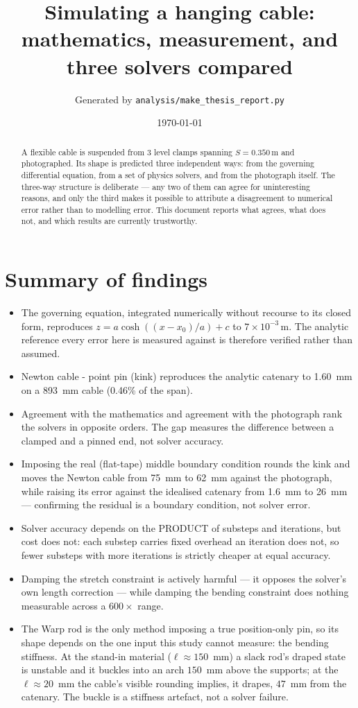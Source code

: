 \documentclass[11pt,a4paper]{article}
\title{Simulating a hanging cable:\\
       mathematics, measurement, and three solvers compared}
\author{Generated by \texttt{analysis/make\_thesis\_report.py}}
\date{\today}
\begin{document}
\maketitle

\begin{abstract}
A flexible cable is suspended from 3 level clamps spanning
$S = 0.350$\,m and photographed. Its shape is predicted three independent
ways: from the governing differential equation, from a set of physics solvers,
and from the photograph itself. The three-way structure is deliberate --- any
two of them can agree for uninteresting reasons, and only the third makes it
possible to attribute a disagreement to numerical error rather than to
modelling error. This document reports what agrees, what does not, and which
results are currently trustworthy.
\end{abstract}

\section*{Summary of findings}
\begin{itemize}
  \item The governing equation, integrated numerically without recourse to its closed form, reproduces $z = a\cosh((x-x_0)/a)+c$ to $7\times10^{-3}$\,\textmu m. The analytic reference every error here is measured against is therefore verified rather than assumed.
  \item Newton cable - point pin (kink) reproduces the analytic catenary to 1.60~mm on a 893~mm cable (0.46\% of the span).
  \item Agreement with the mathematics and agreement with the photograph rank the solvers in opposite orders. The gap measures the difference between a clamped and a pinned end, not solver accuracy.
  \item Imposing the real (flat-tape) middle boundary condition rounds the kink and moves the Newton cable from 75~mm to 62~mm against the photograph, while raising its error against the idealised catenary from 1.6~mm to 26~mm --- confirming the residual is a boundary condition, not solver error.
  \item Solver accuracy depends on the PRODUCT of substeps and iterations, but cost does not: each substep carries fixed overhead an iteration does not, so fewer substeps with more iterations is strictly cheaper at equal accuracy.
  \item Damping the stretch constraint is actively harmful --- it opposes the solver's own length correction --- while damping the bending constraint does nothing measurable across a $600\times$ range.
  \item The Warp rod is the only method imposing a true position-only pin, so its shape depends on the one input this study cannot measure: the bending stiffness. At the stand-in material ($\ell\approx150$~mm) a slack rod's draped state is unstable and it buckles into an arch $150$~mm above the supports; at the $\ell\approx20$~mm the cable's visible rounding implies, it drapes, $47$~mm from the catenary. The buckle is a stiffness artefact, not a solver failure.
\end{itemize}
\end{document}
